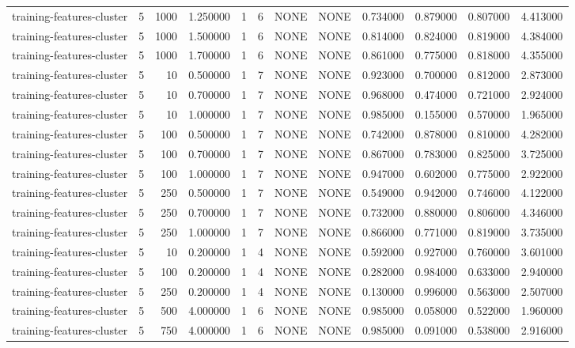 \begin{tabular}{lrrrllllrrrr}
training-features-cluster & 5 & 1000 & 1.250000 & 1 & 6 & NONE & NONE & 0.734000 & 0.879000 & 0.807000 & 4.413000 \\
training-features-cluster & 5 & 1000 & 1.500000 & 1 & 6 & NONE & NONE & 0.814000 & 0.824000 & 0.819000 & 4.384000 \\
training-features-cluster & 5 & 1000 & 1.700000 & 1 & 6 & NONE & NONE & 0.861000 & 0.775000 & 0.818000 & 4.355000 \\
training-features-cluster & 5 & 10 & 0.500000 & 1 & 7 & NONE & NONE & 0.923000 & 0.700000 & 0.812000 & 2.873000 \\
training-features-cluster & 5 & 10 & 0.700000 & 1 & 7 & NONE & NONE & 0.968000 & 0.474000 & 0.721000 & 2.924000 \\
training-features-cluster & 5 & 10 & 1.000000 & 1 & 7 & NONE & NONE & 0.985000 & 0.155000 & 0.570000 & 1.965000 \\
training-features-cluster & 5 & 100 & 0.500000 & 1 & 7 & NONE & NONE & 0.742000 & 0.878000 & 0.810000 & 4.282000 \\
training-features-cluster & 5 & 100 & 0.700000 & 1 & 7 & NONE & NONE & 0.867000 & 0.783000 & 0.825000 & 3.725000 \\
training-features-cluster & 5 & 100 & 1.000000 & 1 & 7 & NONE & NONE & 0.947000 & 0.602000 & 0.775000 & 2.922000 \\
training-features-cluster & 5 & 250 & 0.500000 & 1 & 7 & NONE & NONE & 0.549000 & 0.942000 & 0.746000 & 4.122000 \\
training-features-cluster & 5 & 250 & 0.700000 & 1 & 7 & NONE & NONE & 0.732000 & 0.880000 & 0.806000 & 4.346000 \\
training-features-cluster & 5 & 250 & 1.000000 & 1 & 7 & NONE & NONE & 0.866000 & 0.771000 & 0.819000 & 3.735000 \\
training-features-cluster & 5 & 10 & 0.200000 & 1 & 4 & NONE & NONE & 0.592000 & 0.927000 & 0.760000 & 3.601000 \\
training-features-cluster & 5 & 100 & 0.200000 & 1 & 4 & NONE & NONE & 0.282000 & 0.984000 & 0.633000 & 2.940000 \\
training-features-cluster & 5 & 250 & 0.200000 & 1 & 4 & NONE & NONE & 0.130000 & 0.996000 & 0.563000 & 2.507000 \\
training-features-cluster & 5 & 500 & 4.000000 & 1 & 6 & NONE & NONE & 0.985000 & 0.058000 & 0.522000 & 1.960000 \\
training-features-cluster & 5 & 750 & 4.000000 & 1 & 6 & NONE & NONE & 0.985000 & 0.091000 & 0.538000 & 2.916000 \\

\end{tabular}
